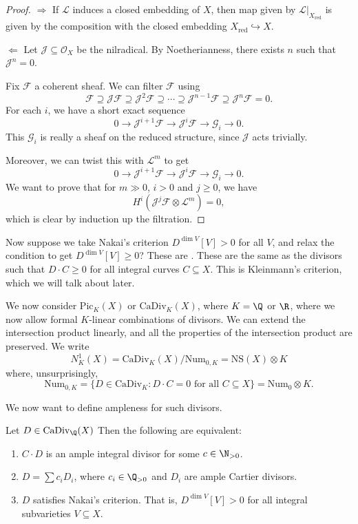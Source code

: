 \documentclass[a4paper]{article}
\newcommand\CaDiv{\mathrm{CaDiv}}
\newcommand\Pic{\mathrm{Pic}}
\newcommand\Num{\mathrm{Num}}
\newcommand\NS{\mathrm{NS}}
\DeclareMathOperator\red{red}
\begin{document}
\begin{proof}
  $\Rightarrow$ If $\mathcal{L}$ induces a closed embedding of $X$, then map given by $\mathcal{L}|_{X_{\red}}$ is given by the composition with the closed embedding $X_{\red} \hookrightarrow X$.

  $\Leftarrow$ Let $\mathcal{J} \subseteq \mathcal{O}_X$ be the nilradical. By Noetherianness, there exists $n$ such that $\mathcal{J}^n = 0$.
  
  Fix $\mathcal{F}$ a coherent sheaf. We can filter $\mathcal{F}$ using
  \[
    \mathcal{F} \supseteq \mathcal{J}\mathcal{F} \supseteq \mathcal{J}^2 \mathcal{F} \supseteq \cdots \supseteq \mathcal{J}^{n - 1} \mathcal{F} \supseteq \mathcal{J}^n \mathcal{F} = 0.
  \]
  For each $i$, we have a short exact sequence
  \[
    0 \to \mathcal{J}^{i + 1} \mathcal{F} \to \mathcal{J}^i \mathcal{F} \to \mathcal{G}_i \to 0.
  \]
  This $\mathcal{G}_i$ is really a sheaf on the reduced structure, since $\mathcal{J}$ acts trivially.

  Moreover, we can twist this with $\mathcal{L}^m$ to get
  \[
    0 \to \mathcal{J}^{i + 1} \mathcal{F} \to \mathcal{J}^i \mathcal{F} \to \mathcal{G}_i \to 0.
  \]
  We want to prove that for $m \gg 0$, $i > 0$ and $j \geq 0$, we have
  \[
    H^i(\mathcal{J}^j \mathcal{F} \otimes \mathcal{L}^m) = 0,
  \]
  which is clear by induction up the filtration. 
\end{proof}

Now suppose we take Nakai's criterion $D^{\dim V}[V] > 0$ for all $V$, and relax the condition to get $D^{\dim V}[V] \geq 0$? These are . These are the same as the divisors such that $D \cdot C \geq 0$ for all integral curves $C \subseteq X$. This is Kleinmann's criterion, which we will talk about later.

We now consider $\Pic_K(X)$ or $\CaDiv_K(X)$, where $K = \Q$ or $\R$, where we now allow formal $K$-linear combinations of divisors. We can extend the intersection product linearly, and all the properties of the intersection product are preserved. We write
\[
  N^1_K(X) = \CaDiv_K(X) / \Num_{0, K} = \NS(X) \otimes K 
\]
where, unsurprisingly,
\[
  \Num_{0, K} = \{D \in \CaDiv_K: D \cdot C = 0\text{ for all }C \subseteq X\} = \Num_0 \otimes K.
\]

We now want to define ampleness for such divisors.

\begin{prop}
  Let $D \in \CaDiv_\Q(X)$ Then the following are equivalent:
  \begin{enumerate}
    \item $C \cdot D$ is an ample integral divisor for some $c \in \N_{>0}$.
    \item $D = \sum c_i D_i$, where $c_i \in \Q_{>0}$ and $D_i$ are ample Cartier divisors.
    \item $D$ satisfies Nakai's criterion. That is, $D^{\dim V} [V] > 0$ for all integral subvarieties $V \subseteq X$.
  \end{enumerate}
\end{prop}
\end{document}
